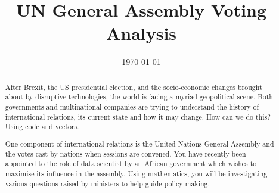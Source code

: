 \documentclass[12pt, a4paper, draft]{article}
\title{UN General Assembly Voting Analysis}
\author{}
\date{\today}
\begin{document}
\maketitle

\begin{abstract}
After Brexit, the US presidential election, and the socio-economic changes brought about by disruptive technologies, the world is facing a myriad geopolitical scene.  Both governments and multinational companies are trying to understand the history of international relations, its current state and how it may change.  How can we do this? Using code and vectors.

One component of international relations is the United Nations General Assembly and the votes cast by nations when sessions are convened.  You have recently been appointed to the role of data scientist by an African government which wishes to maximise its influence in the assembly. Using mathematics, you will be investigating various questions raised by ministers to help guide policy making.
\end{abstract}
\end{document}
